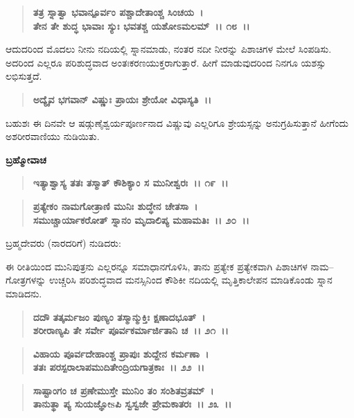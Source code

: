 \begin{verse}
\textbf{ತತ್ರ ಸ್ನಾತ್ವಾ ಭವಾನ್ಪೂರ್ವಂ ಪಶ್ಚಾದೇತಾಂಶ್ಚ ಸಿಂಚಯ~।}\\\textbf{ತೇನ ತೇ ಶುದ್ಧ ಭಾವಾಃ ಸ್ಯುಃ ಭವತಶ್ಚ ಯಶೋಽಮಲಮ್~।। ೧೮~।।}
\end{verse}

ಆದುದರಿಂದ ಮೊದಲು ನೀನು ನದಿಯಲ್ಲಿ ಸ್ನಾನಮಾಡು, ನಂತರ ನದೀ ನೀರನ್ನು ಪಿಶಾಚಿಗಳ ಮೇಲೆ ಸಿಂಪಡಿಸು. ಅದರಿಂದ ಎಲ್ಲರೂ ಪರಿಶುದ್ಧವಾದ ಅಂತಃಕರಣಯುಕ್ತ\-ರಾಗುತ್ತಾರೆ. ಹೀಗೆ ಮಾಡುವುದರಿಂದ ನಿನಗೂ ಯಶಸ್ಸು ಲಭಿಸುತ್ತದೆ.

\begin{verse}
\textbf{ಅದ್ಯೈವ ಭಗವಾನ್ ವಿಷ್ಣುಃ ಪ್ರಾಯಃ ಶ್ರೇಯೋ ವಿಧಾಸ್ಯತಿ~।।}
\end{verse}

ಬಹುಶಃ ಈ ದಿನವೇ ಆ ಷಡ್ಗುಣೈಶ್ವರ್ಯಪೂರ್ಣನಾದ ವಿಷ್ಣುವು ಎಲ್ಲರಿಗೂ ಶ್ರೇಯಸ್ಸನ್ನು ಅನುಗ್ರಹಿಸುತ್ತಾನೆ  ಹೀಗೆಂದು ಅಶರೀರವಾಣಿಯು ನುಡಿಯಿತು.

\begin{flushleft}
\textbf{ಬ್ರಹ್ಮೋವಾಚ}
\end{flushleft}

\begin{verse}
\textbf{ಇತ್ಯಾಶ್ವಾಸ್ಯ ತತಃ ತಸ್ಮಾತ್ ಕೌಶಿಕ್ಯಾಂ ಸ ಮುನೀಶ್ವರಃ~।। ೧೯~।।} 
\end{verse}

\begin{verse}
\textbf{ಪ್ರತ್ಯೇಕಂ ನಾಮಗೋತ್ರಾಣಿ ಮುನಿಃ ಶುದ್ಧೇನ ಚೇತಸಾ~।}\\\textbf{ಸಮುಚ್ಚಾರ್ಯಾಕರೋತ್ ಸ್ನಾನಂ ಮೃದಾಲಿಪ್ಯ ಮಹಾಮತಿಃ~।। ೨೦~।।}
\end{verse}

ಬ್ರಹ್ಮದೇವರು (ನಾರದರಿಗೆ) ನುಡಿದರು:

ಈ ರೀತಿಯಿಂದ ಮುನಿಪುತ್ರನು ಎಲ್ಲರನ್ನೂ ಸಮಾಧಾನಗೊಳಿಸಿ, ತಾನು ಪ್ರತ್ಯೇಕ ಪ್ರತ್ಯೇಕವಾಗಿ ಪಿಶಾಚಿಗಳ ನಾಮ–ಗೋತ್ರಗಳನ್ನು ಉಚ್ಚರಿಸಿ ಪರಿಶುದ್ಧವಾದ ಮನಸ್ಸಿನಿಂದ ಕೌಶಿಕೀ ನದಿಯಲ್ಲಿ ಮೃತ್ತಿಕಾಲೇಪನ ಮಾಡಿಕೊಂಡು ಸ್ನಾನ ಮಾಡಿದನು.

\begin{verse}
\textbf{ದದೌ ತತ್ಕರ್ಮಜಂ ಪುಣ್ಯಂ ತಸ್ಮಾನ್ಮುಕ್ತಿಃ ಕ್ಷಣಾದಭೂತ್~।}\\\textbf{ಶರೀರಾಣ್ಯಪಿ ತೇ ಸರ್ವೇ ಪೂರ್ವಕರ್ಮಾರ್ಜಿತಾನಿ ಚ~।। ೨೧~।। }
\end{verse}

\begin{verse}
\textbf{ವಿಹಾಯ ಪೂರ್ವದೇಹಾಂಶ್ಚ ಪ್ರಾಪುಃ ಶುದ್ದೇನ ಕರ್ಮಣಾ~।}\\\textbf{ತತಃ ಪರಸ್ಪರಾಲಾಪಮುದಿತೇಂದ್ರಿಯಗಾತ್ರಕಾಃ~।। ೨೨~।। }
\end{verse}

\begin{verse}
\textbf{ಸಾಷ್ಟಾಂಗಂ ಚ ಪ್ರಣೇಮುಸ್ತೇ ಮುನಿಂ ತಂ ಸಂಶಿತವ್ರತಮ್~।}\\\textbf{ತಾನುತ್ಥಾ ಪ್ಯ ಸುಯಜ್ಞೋsಪಿ ಸ್ವಸ್ವಜೇ ಪ್ರೇಮಕಾತರಃ~।। ೨೩~।।}
\end{verse}

